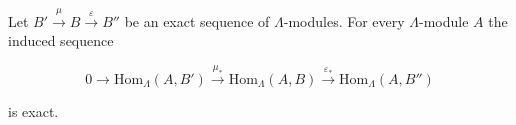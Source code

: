 Let $B' \xrightarrow{\mu} B \xrightarrow{\varepsilon} B''$ be an exact sequence of $\Lambda$-modules. For every $\Lambda$-module $A$ the induced sequence

$$0 \rightarrow \text{Hom}_\Lambda(A, B') \xrightarrow{\mu_*} \text{Hom}_\Lambda(A, B) \xrightarrow{\varepsilon_*} \text{Hom}_\Lambda(A, B'')$$

is exact.
